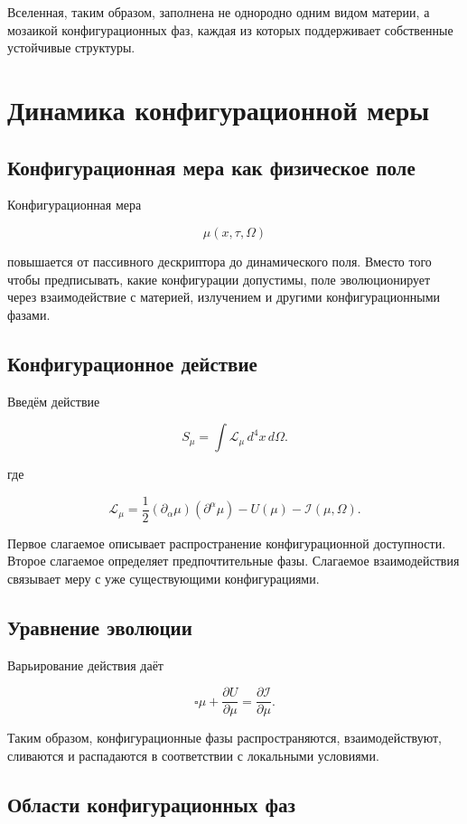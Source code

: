 Вселенная, таким образом, заполнена не однородно одним видом материи, а мозаикой конфигурационных фаз, каждая из которых поддерживает собственные устойчивые структуры.

\chapter{Динамика конфигурационной меры}

\section{Конфигурационная мера как физическое поле}

Конфигурационная мера

\[ \mu(x,\tau,\Omega) \]

повышается от пассивного дескриптора до динамического поля. Вместо того чтобы предписывать, какие конфигурации допустимы, поле эволюционирует через взаимодействие с материей, излучением и другими конфигурационными фазами.

\section{Конфигурационное действие}

Введём действие

\[ \boxed{ S_\mu = \int \mathcal L_\mu \,d^4x\,d\Omega. } \]

где

\[ \mathcal L_\mu = \frac12 (\partial_\alpha\mu) (\partial^\alpha\mu) - U(\mu) - \mathcal I(\mu,\Omega). \]

Первое слагаемое описывает распространение конфигурационной доступности. Второе слагаемое определяет предпочтительные фазы. Слагаемое взаимодействия связывает меру с уже существующими конфигурациями.

\section{Уравнение эволюции}

Варьирование действия даёт

\[ \boxed{ \square\mu + \frac{\partial U}{\partial\mu} = \frac{\partial\mathcal I}{\partial\mu}. } \]

Таким образом, конфигурационные фазы распространяются, взаимодействуют, сливаются и распадаются в соответствии с локальными условиями.

\section{Области конфигурационных фаз}

